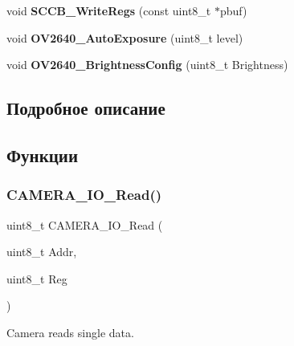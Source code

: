 \begin{DoxyCompactItemize}
\mbox{\label{group___o_v2640___private___functions_gafc67aa8d6b647d02687fa0582fbd39cc}} 
void {\bfseries S\+C\+C\+B\+\_\+\+Write\+Regs} (const uint8\+\_\+t $\ast$pbuf)
\item 
\mbox{\label{group___o_v2640___private___functions_ga5dfda64dfd5f9d8b21c2433c7e1e42fe}} 
void {\bfseries O\+V2640\+\_\+\+Auto\+Exposure} (uint8\+\_\+t level)
\item 
\mbox{\label{group___o_v2640___private___functions_ga481ceacfba870cbd2566b1cc2a243bb7}} 
void {\bfseries O\+V2640\+\_\+\+Brightness\+Config} (uint8\+\_\+t Brightness)
\end{DoxyCompactItemize}


\subsection{Подробное описание}


\subsection{Функции}
\mbox{\label{group___o_v2640___private___functions_gaf0a9c7f2380cdcd4bcd801a5681d3b4b}} 
\subsubsection{\texorpdfstring{C\+A\+M\+E\+R\+A\+\_\+\+I\+O\+\_\+\+Read()}{CAMERA\_IO\_Read()}}
{\footnotesize\ttfamily uint8\+\_\+t C\+A\+M\+E\+R\+A\+\_\+\+I\+O\+\_\+\+Read (\begin{DoxyParamCaption}\item[{uint8\+\_\+t}]{Addr,  }\item[{uint8\+\_\+t}]{Reg }\end{DoxyParamCaption})}



Camera reads single data. 


